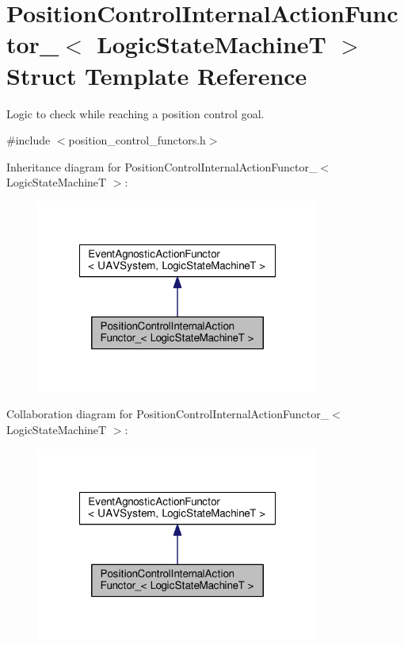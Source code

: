 \hypertarget{structPositionControlInternalActionFunctor__}{\section{Position\-Control\-Internal\-Action\-Functor\-\_\-$<$ Logic\-State\-Machine\-T $>$ Struct Template Reference}
\label{structPositionControlInternalActionFunctor__}
}


Logic to check while reaching a position control goal.  




{\ttfamily \#include $<$position\-\_\-control\-\_\-functors.\-h$>$}



Inheritance diagram for Position\-Control\-Internal\-Action\-Functor\-\_\-$<$ Logic\-State\-Machine\-T $>$\-:\nopagebreak
\begin{figure}[H]
\begin{center}
\leavevmode
\includegraphics[width=264pt]{structPositionControlInternalActionFunctor____inherit__graph}
\end{center}
\end{figure}


Collaboration diagram for Position\-Control\-Internal\-Action\-Functor\-\_\-$<$ Logic\-State\-Machine\-T $>$\-:\nopagebreak
\begin{figure}[H]
\begin{center}
\leavevmode
\includegraphics[width=264pt]{structPositionControlInternalActionFunctor____coll__graph}
\end{center}
\end{figure}

